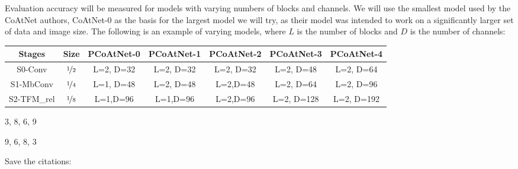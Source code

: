 Evaluation accuracy will be measured for models with varying
numbers of blocks and channels. We will use the smallest model
used by the CoAtNet authors, CoAtNet-0 as the basis for the largest model we will try, as their model was intended to work
on a significantly larger set of data and image size. The following is an example of varying models, where
\(L\) is the number of blocks and \(D\) is the number of channels:

\begin{table}[h]
  \centering
  \begin{tabular}{|c|c|c|c|c|c|c|}
    \hline
    \textbf{Stages} & \textbf{Size} & \textbf{PCoAtNet-0} & \textbf{PCoAtNet-1} & \textbf{PCoAtNet-2} & \textbf{PCoAtNet-3} & \textbf{PCoAtNet-4} \\
    \hline
    S0-Conv & \(\nicefrac{1}{2}\) & L=2, D=32  & L=2, D=32 & L=2, D=32 & L=2, D=48 & L=2, D=64 \\
    S1-MbConv & \(\nicefrac{1}{4}\)  & L=1, D=48 & L=2, D=48 & L=2,D=48 & L=2, D=64 & L=2, D=96\\
    S2-TFM_{rel} & \(\nicefrac{1}{8}\)  & L=1,D=96 & L=1,D=96 & L=2,D=96 & L=2, D=128 & L=2, D=192 \\
    \hline
    \end{tabular}
\end{table}

3, 8, 6, 9

9, 6, 8, 3


Save the citations:

